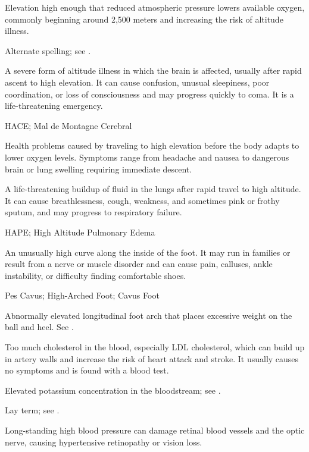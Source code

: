  Elevation high enough that reduced atmospheric pressure lowers available oxygen, commonly beginning around 2,500 meters and increasing the risk of altitude illness.

 Alternate spelling; see .

 A severe form of altitude illness in which the brain is affected, usually after rapid ascent to high elevation. It can cause confusion, unusual sleepiness, poor coordination, or loss of consciousness and may progress quickly to coma. It is a life-threatening emergency.

\synonyms
HACE; Mal de Montagne Cerebral

 Health problems caused by traveling to high elevation before the body adapts to lower oxygen levels. Symptoms range from headache and nausea to dangerous brain or lung swelling requiring immediate descent.

 A life-threatening buildup of fluid in the lungs after rapid travel to high altitude. It can cause breathlessness, cough, weakness, and sometimes pink or frothy sputum, and may progress to respiratory failure.

\synonyms
HAPE; High Altitude Pulmonary Edema

 An unusually high curve along the inside of the foot. It may run in families or result from a nerve or muscle disorder and can cause pain, calluses, ankle instability, or difficulty finding comfortable shoes.

\synonyms
Pes Cavus; High-Arched Foot; Cavus Foot

 Abnormally elevated longitudinal foot arch that places excessive weight on the ball and heel. See .

 Too much cholesterol in the blood, especially LDL cholesterol, which can build up in artery walls and increase the risk of heart attack and stroke. It usually causes no symptoms and is found with a blood test.

 Elevated potassium concentration in the bloodstream; see .

 Lay term; see .

 Long-standing high blood pressure can damage retinal blood vessels and the optic nerve, causing hypertensive retinopathy or vision loss.

